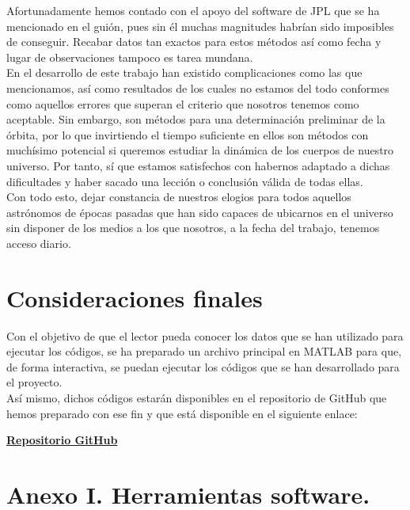 \documentclass{article}
\numberwithin{equation}{section}
\begin{document}
Afortunadamente hemos contado con el apoyo del software de JPL que se ha mencionado en el guión, pues sin él muchas magnitudes habrían sido imposibles de conseguir. Recabar datos tan exactos para estos métodos así como fecha y lugar de observaciones tampoco es tarea mundana.\\

\newpage
En el desarrollo de este trabajo han existido complicaciones como las que mencionamos, así como resultados de los cuales no estamos del todo conformes como aquellos errores que superan el criterio que nosotros tenemos como aceptable. Sin embargo, son métodos para una determinación preliminar de la órbita, por lo que invirtiendo el tiempo suficiente en ellos son métodos con muchísimo potencial si queremos estudiar la dinámica de los cuerpos de nuestro universo. Por tanto, sí que estamos satisfechos con habernos adaptado a dichas dificultades y haber sacado una lección o conclusión válida de todas ellas.\\ 

Con todo esto, dejar constancia de nuestros elogios para todos aquellos astrónomos de épocas pasadas que han sido capaces de ubicarnos en el universo sin disponer de los medios a los que nosotros, a la fecha del trabajo, tenemos acceso diario.

\section{Consideraciones finales}

Con el objetivo de que el lector pueda conocer los datos que se han utilizado para ejecutar los códigos, se ha preparado un archivo principal en MATLAB para que, de forma interactiva, se puedan ejecutar los códigos que se han desarrollado para el proyecto.\\

Así mismo, dichos códigos estarán disponibles en el repositorio de GitHub que hemos preparado con ese fin y que está disponible en el siguiente enlace:

\begin{center}
    \href{https://github.com/Nacho-88/Determinacion_de_orbitas}{\textbf{Repositorio GitHub}}
\end{center}

\newpage
\section{Anexo I. Herramientas software.}
\end{document}
